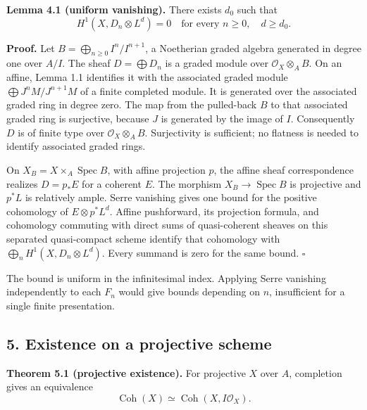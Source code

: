 \documentclass[11pt]{article}
\begin{document}
\textbf{Lemma 4.1 (uniform vanishing).} There exists \(d_0\) such that
\[
H^1(X,D_n\otimes L^d)=0\quad\text{for every }n\geq0,
\quad d\geq d_0.
\]

\textbf{Proof.} Let \(B=\bigoplus_{n\geq0}I^n/I^{n+1}\), a Noetherian
graded algebra generated in degree one over \(A/I\). The sheaf
\(D=\bigoplus D_n\) is a graded module over \(\mathcal O_X\otimes_A B\).
On an affine, Lemma 1.1 identifies it with the associated graded module
\(\bigoplus J^nM/J^{n+1}M\) of a finite completed module. It is
generated over the associated graded ring in degree zero. The map from
the pulled-back \(B\) to that associated graded ring is surjective,
because \(J\) is generated by the image of \(I\). Consequently \(D\) is
of finite type over \(\mathcal O_X\otimes_A B\). Surjectivity is
sufficient; no flatness is needed to identify associated graded rings.

On \(X_B=X\times_A\operatorname{Spec}B\), with affine projection \(p\),
the affine sheaf correspondence realizes \(D=p_*E\) for a coherent
\(E\). The morphism \(X_B\to\operatorname{Spec}B\) is projective and
\(p^*L\) is relatively ample. Serre vanishing gives one bound for the
positive cohomology of \(E\otimes p^*L^d\). Affine pushforward, its
projection formula, and cohomology commuting with direct sums of
quasi-coherent sheaves on this separated quasi-compact scheme identify
that cohomology with \(\bigoplus_n H^1(X,D_n\otimes L^d)\). Every
summand is zero for the same bound. \(\square\)

The bound is uniform in the infinitesimal index. Applying Serre
vanishing independently to each \(F_n\) would give bounds depending on
\(n\), insufficient for a single finite presentation.

\subsection{5. Existence on a projective
scheme}\label{existence-on-a-projective-scheme}

\textbf{Theorem 5.1 (projective existence).} For projective \(X\) over
\(A\), completion gives an equivalence \[
\operatorname{Coh}(X)\simeq\operatorname{Coh}(X,I\mathcal O_X).
\]
\end{document}

